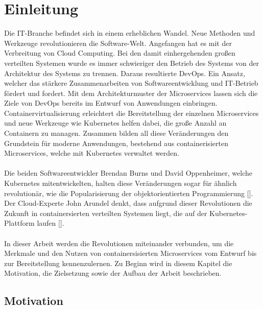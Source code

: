 \section{Einleitung}

\vspace{1em} 

Die IT-Branche befindet sich in einem erheblichen Wandel. Neue Methoden und Werkzeuge revolutionieren die Software-Welt. Angefangen hat es mit der Verbreitung von Cloud Computing. Bei den damit einhergehenden großen verteilten Systemen wurde es immer schwieriger den Betrieb des Systems von der Architektur des Systems zu trennen. Daraus resultierte DevOps. Ein Ansatz, welcher das stärkere Zusammenarbeiten von Softwareentwicklung und IT-Betrieb fördert und fordert. Mit dem Architekturmuster der Microservices lassen sich die Ziele von DevOps bereits im Entwurf von Anwendungen einbringen. Containervirtualisierung erleichtert die Bereitstellung der einzelnen Microservices und neue Werkzeuge wie Kubernetes helfen dabei, die große Anzahl an Containern zu managen. Zusammen bilden all diese Veränderungen den Grundstein für moderne Anwendungen, bestehend aus containerisierten Microservices, welche mit Kubernetes verwaltet werden. \\
\\
Die beiden Softwareentwickler Brendan Burns und David Oppenheimer, welche Kubernetes mitentwickelten, halten diese Veränderungen sogar für ähnlich revolutionär, wie die Popularisierung der objektorientierten Programmierung [\cite[S. 1]{burnsDesign2016}]. Der Cloud-Experte John Arundel denkt, dass aufgrund dieser Revolutionen die Zukunft in containersierten verteilten Systemen liegt, die auf der Kubernetes-Plattform laufen [\cite[S. 1]{arundelCloud2019}]. \\
\\
In dieser Arbeit werden die Revolutionen miteinander verbunden, um die Merkmale und den Nutzen von containersisierten Microservices vom Entwurf bis zur Bereitstellung kennenzulernen. Zu Beginn wird in diesem Kapitel die Motivation, die Zielsetzung sowie der Aufbau der Arbeit beschrieben.

\subsection{Motivation}

